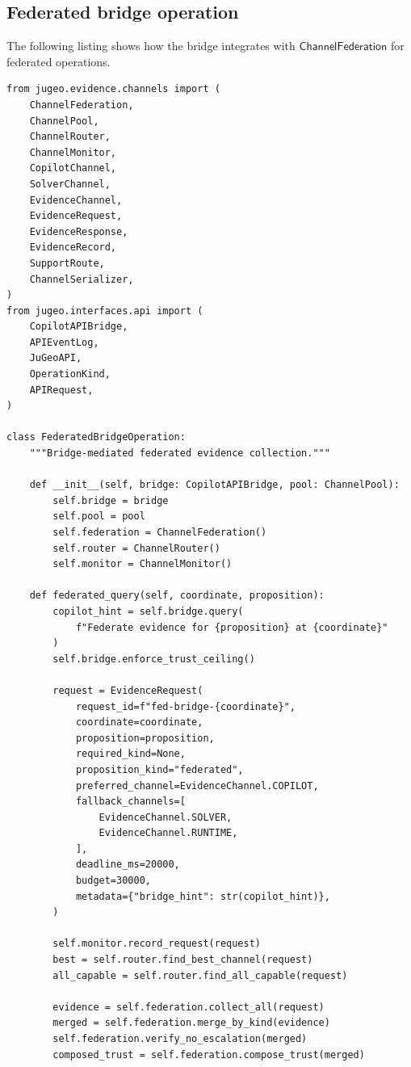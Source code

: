 \documentclass[11pt]{article}
\newcommand{\ChanFed}{\mathsf{ChannelFederation}}
\begin{document}
\subsection{Federated bridge operation}

The following listing shows how the bridge integrates
with $\ChanFed$ for federated operations.

\begin{lstlisting}[style=jugeo-python,
  caption={Federated bridge operation},
  label={lst:fedbridge}]
from jugeo.evidence.channels import (
    ChannelFederation,
    ChannelPool,
    ChannelRouter,
    ChannelMonitor,
    CopilotChannel,
    SolverChannel,
    EvidenceChannel,
    EvidenceRequest,
    EvidenceResponse,
    EvidenceRecord,
    SupportRoute,
    ChannelSerializer,
)
from jugeo.interfaces.api import (
    CopilotAPIBridge,
    APIEventLog,
    JuGeoAPI,
    OperationKind,
    APIRequest,
)

class FederatedBridgeOperation:
    """Bridge-mediated federated evidence collection."""

    def __init__(self, bridge: CopilotAPIBridge, pool: ChannelPool):
        self.bridge = bridge
        self.pool = pool
        self.federation = ChannelFederation()
        self.router = ChannelRouter()
        self.monitor = ChannelMonitor()

    def federated_query(self, coordinate, proposition):
        copilot_hint = self.bridge.query(
            f"Federate evidence for {proposition} at {coordinate}"
        )
        self.bridge.enforce_trust_ceiling()

        request = EvidenceRequest(
            request_id=f"fed-bridge-{coordinate}",
            coordinate=coordinate,
            proposition=proposition,
            required_kind=None,
            proposition_kind="federated",
            preferred_channel=EvidenceChannel.COPILOT,
            fallback_channels=[
                EvidenceChannel.SOLVER,
                EvidenceChannel.RUNTIME,
            ],
            deadline_ms=20000,
            budget=30000,
            metadata={"bridge_hint": str(copilot_hint)},
        )

        self.monitor.record_request(request)
        best = self.router.find_best_channel(request)
        all_capable = self.router.find_all_capable(request)

        evidence = self.federation.collect_all(request)
        merged = self.federation.merge_by_kind(evidence)
        self.federation.verify_no_escalation(merged)
        composed_trust = self.federation.compose_trust(merged)


\end{lstlisting}
\end{document}
